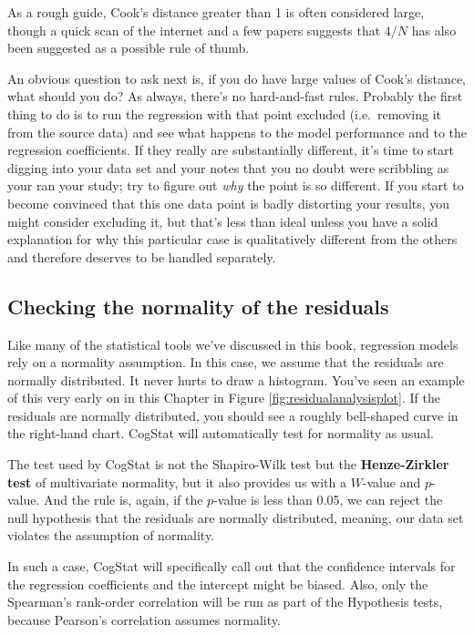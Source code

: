 \documentclass[
]{book}
\theoremstyle{definition}
\theoremstyle{definition}
\theoremstyle{definition}
\theoremstyle{definition}
\theoremstyle{remark}
\begin{document}
As a rough guide, Cook's distance greater than 1 is often considered large, though a quick scan of the internet and a few papers suggests that \(4/N\) has also been suggested as a possible rule of thumb.

An obvious question to ask next is, if you do have large values of Cook's distance, what should you do? As always, there's no hard-and-fast rules. Probably the first thing to do is to run the regression with that point excluded (i.e.~removing it from the source data) and see what happens to the model performance and to the regression coefficients. If they really are substantially different, it's time to start digging into your data set and your notes that you no doubt were scribbling as your ran your study; try to figure out \emph{why} the point is so different. If you start to become convinced that this one data point is badly distorting your results, you might consider excluding it, but that's less than ideal unless you have a solid explanation for why this particular case is qualitatively different from the others and therefore deserves to be handled separately.

\hypertarget{regressionnormality}{%
\subsection{Checking the normality of the residuals}\label{regressionnormality}}

Like many of the statistical tools we've discussed in this book, regression models rely on a normality assumption. In this case, we assume that the residuals are normally distributed. It never hurts to draw a histogram. You've seen an example of this very early on in this Chapter in Figure \ref{fig:residualanalysisplot}. If the residuals are normally distributed, you should see a roughly bell-shaped curve in the right-hand chart. CogStat will automatically test for normality as usual.

The test used by CogStat is not the Shapiro-Wilk test but the \textbf{Henze-Zirkler test} of multivariate normality, but it also provides us with a \(W\)-value and \(p\)-value. And the rule is, again, if the \(p\)-value is less than 0.05, we can reject the null hypothesis that the residuals are normally distributed, meaning, our data set violates the assumption of normality.

In such a case, CogStat will specifically call out that the confidence intervals for the regression coefficients and the intercept might be biased. Also, only the Spearman's rank-order correlation will be run as part of the Hypothesis tests, because Pearson's correlation assumes normality.
\end{document}
